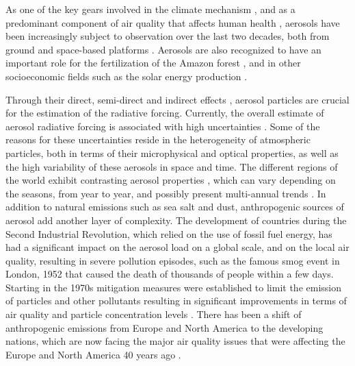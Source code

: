 \documentclass[journal abbreviation, manuscript]{copernicus}
\begin{document}


\introduction  %
As one of the key gears involved in the climate mechanism \citep{poschl2005atmospheric}, and as a predominant component of air quality that affects human health \citep{burnett2014integrated}, aerosols have been increasingly subject to observation over the last two decades, both from ground and space-based platforms \citep{holben2001emerging,kaufman2002satellite}.  Aerosols are also recognized to have an important role for the fertilization of the Amazon forest \citep{yu2015fertilizing}, and in other socioeconomic fields such as the solar energy production \citep{Li11867,labordena2018blue}.

Through their direct, semi-direct and indirect effects \citep{rap2013natural,johnson2004semi,lohmann2005global}, aerosol particles are crucial for the estimation of the radiative forcing. Currently, the overall estimate of aerosol radiative forcing is associated with high uncertainties \citep{haywood2000estimates, stocker2014climate}. Some of the reasons for these uncertainties reside in the heterogeneity of atmospheric particles, both in terms of their microphysical and optical properties, as well as the high variability of these aerosols in space and time. The different regions of the world exhibit contrasting aerosol properties \citep{holben2001emerging}, which can vary depending on the seasons, from year to year, and possibly present multi-annual trends \citep{streets2009anthropogenic}. In addition to natural emissions such as sea salt and dust, anthropogenic sources of aerosol add another layer of complexity. The development of countries during the Second Industrial Revolution, which relied on the use of fossil fuel energy, has had a significant impact on the aerosol load on a global scale, and on the local air quality, resulting in severe pollution episodes, such as the famous smog event in London, 1952 \citep{bell2004retrospective} that caused the death of thousands of people within a few days.
Starting in the 1970s mitigation measures were established to limit the emission of particles and other pollutants \citep{bryner1995blue,turnock2016impact} resulting in significant improvements in terms of air quality and particle concentration levels \citep{likens2001long}. There has been a shift of anthropogenic emissions from Europe and North America to the developing nations, which are now facing the major air quality issues that were affecting the Europe and North America 40 years ago \citep{streets2008aerosol,ramachandran2012aerosol}.
\end{document}
